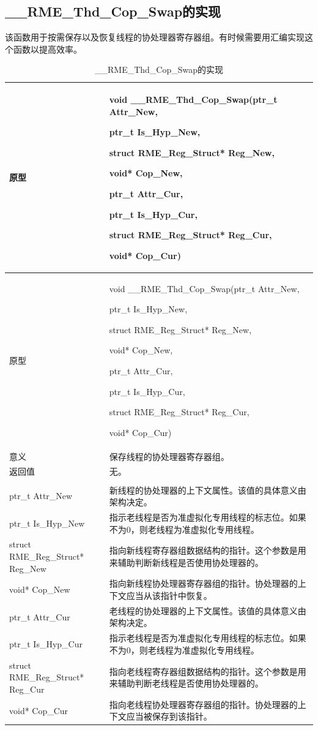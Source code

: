 \subsection{\_\_RME\_Thd\_Cop\_Swap的实现}\label{subsec:7-rme-thd-cop-swap-implementation}

该函数用于按需保存以及恢复线程的协处理器寄存器组。有时候需要用汇编实现这个函数以提高效率。

\begin{xltabular}{\textwidth}{@{}>{\hsize\raggedright\arraybackslash}X>{\hsize\raggedright\arraybackslash}X@{}}
\caption{\_\_RME\_Thd\_Cop\_Swap的实现}\label{tab:7-72-rme-thd-cop-swap-implementation}\\
\toprule
原型\strut
 & void \_\_RME\_Thd\_Cop\_Swap(ptr\_t Attr\_New,

ptr\_t Is\_Hyp\_New,

struct RME\_Reg\_Struct* Reg\_New,

void* Cop\_New,

ptr\_t Attr\_Cur,

ptr\_t Is\_Hyp\_Cur,

struct RME\_Reg\_Struct* Reg\_Cur,

void* Cop\_Cur)\strut
\tabularnewline
\endfirsthead
\toprule
原型\strut
 & void \_\_RME\_Thd\_Cop\_Swap(ptr\_t Attr\_New,

ptr\_t Is\_Hyp\_New,

struct RME\_Reg\_Struct* Reg\_New,

void* Cop\_New,

ptr\_t Attr\_Cur,

ptr\_t Is\_Hyp\_Cur,

struct RME\_Reg\_Struct* Reg\_Cur,

void* Cop\_Cur)\strut
\tabularnewline
\midrule
\endhead
\bottomrule
\endlastfoot
意义 & 保存线程的协处理器寄存器组。\tabularnewline
返回值 & 无。\tabularnewline
{}\tabularnewline
ptr\_t Attr\_New & 新线程的协处理器的上下文属性。该值的具体意义由架构决定。\tabularnewline
ptr\_t Is\_Hyp\_New & 指示老线程是否为准虚拟化专用线程的标志位。如果不为0，则老线程为准虚拟化专用线程。\tabularnewline
struct RME\_Reg\_Struct* Reg\_New & 指向新线程寄存器组数据结构的指针。这个参数是用来辅助判断新线程是否使用协处理器的。\tabularnewline
void* Cop\_New & 指向新线程协处理器寄存器组的指针。协处理器的上下文应当从该指针中恢复。\tabularnewline
ptr\_t Attr\_Cur & 老线程的协处理器的上下文属性。该值的具体意义由架构决定。\tabularnewline
ptr\_t Is\_Hyp\_Cur & 指示老线程是否为准虚拟化专用线程的标志位。如果不为0，则老线程为准虚拟化专用线程。\tabularnewline
struct RME\_Reg\_Struct* Reg\_Cur & 指向老线程寄存器组数据结构的指针。这个参数是用来辅助判断老线程是否使用协处理器的。\tabularnewline
void* Cop\_Cur & 指向老线程协处理器寄存器组的指针。协处理器的上下文应当被保存到该指针。\tabularnewline
\end{xltabular}

